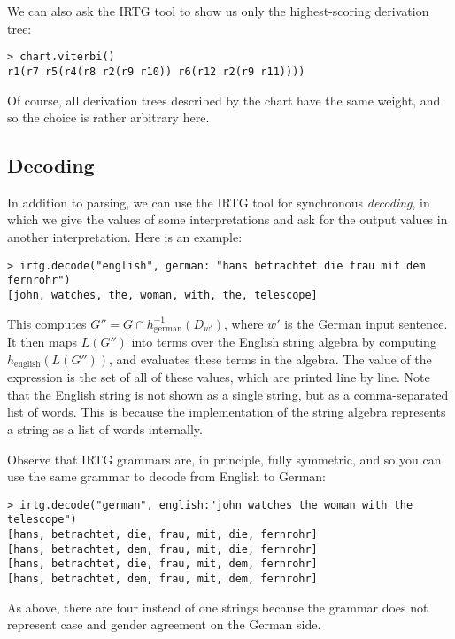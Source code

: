 \documentclass[11pt]{article}
\begin{document}
We can also ask the IRTG tool to show us only the highest-scoring
derivation tree:

\begin{verbatim}
> chart.viterbi()
r1(r7 r5(r4(r8 r2(r9 r10)) r6(r12 r2(r9 r11))))
\end{verbatim}

Of course, all derivation trees described by the chart have the same
weight, and so the choice is rather arbitrary here.

\subsection{Decoding}

In addition to parsing, we can use the IRTG tool for synchronous
\emph{decoding}, in which we give the values of some interpretations
and ask for the output values in another interpretation. Here is an
example:

\begin{verbatim}
> irtg.decode("english", german: "hans betrachtet die frau mit dem fernrohr")
[john, watches, the, woman, with, the, telescope]
\end{verbatim}

This computes $G'' = G \cap h^{-1}_\mathrm{german}(D_{w'})$, where
$w'$ is the German input sentence. It then maps $L(G'')$ into terms
over the English string algebra by computing
$h_\mathrm{english}(L(G''))$, and evaluates these terms in the
algebra. The value of the expression is the set of all of these
values, which are printed line by line. Note that the English string
is not shown as a single string, but as a comma-separated list of
words.  This is because the implementation of the string algebra
represents a string as a list of words internally.

Observe that IRTG grammars are, in principle, fully symmetric, and so
you can use the same grammar to decode from English to German:

\begin{verbatim}
> irtg.decode("german", english:"john watches the woman with the telescope")
[hans, betrachtet, die, frau, mit, die, fernrohr]
[hans, betrachtet, dem, frau, mit, die, fernrohr]
[hans, betrachtet, die, frau, mit, dem, fernrohr]
[hans, betrachtet, dem, frau, mit, dem, fernrohr]
\end{verbatim}

As above, there are four instead of one strings because the grammar does
not represent case and gender agreement on the German side.
\end{document}
